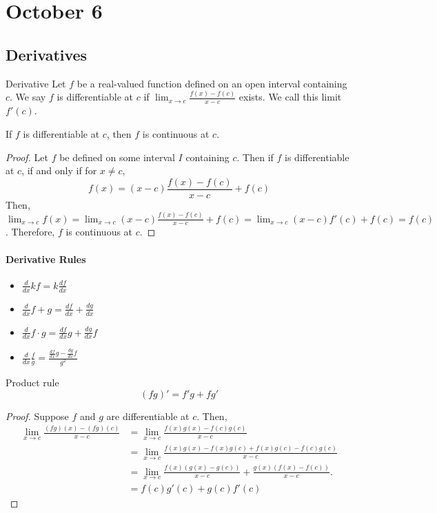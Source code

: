 \section{October 6}

\subsection{Derivatives}
\begin{definition}{Derivative}{}
    Let $f$ be a real-valued function defined on an open interval containing $c$. We say $f$ is differentiable at $c$ if $\lim_{x \to c} \frac{f(x) - f(c)}{x - c}$ exists. We call this limit $f'(c)$.
\end{definition}

\begin{theorem}{}{}
    If $f$ is differentiable at $c$, then $f$ is continuous at $c$.
\end{theorem}
\begin{proof}
    Let $f$ be defined on some interval $I$ containing $c$. Then if $f$ is differentiable at $c$, if and only if for $x \neq c$, $$f(x) = (x - c) \frac{f(x) - f(c)}{x - c} + f(c)$$ Then, $\lim_{x \to c} f(x) = \lim_{x \to c} (x - c) \frac{f(x) - f(c)}{x - c} + f(c) = \lim_{x \to c} (x - c) f'(c) + f(c) = f(c)$. Therefore, $f$ is continuous at $c$.
\end{proof}

\paragraph{Derivative Rules}
\begin{itemize}
    \item $\frac{d}{dx} kf = k \frac{df}{dx}$
    \item $\frac{d}{dx} f + g = \frac{df}{dx} + \frac{dg}{dx}$
    \item $\frac{d}{dx} f \cdot g = \frac{df}{dx} g + \frac{dg}{dx} f$
    \item $\frac{d}{dx} \frac{f}{g} = \frac{\frac{df}{dx} g - \frac{dg}{dx} f}{g^2}$
\end{itemize}

\begin{theorem}{Product rule}{}
    $$(fg)' = f'g + fg'$$
\end{theorem}
\begin{proof}
    Suppose $f$ and $g$ are differentiable at $c$. Then,
    \begin{align*}
        \lim_{x \to c} \frac{(fg)(x) - (fg)(c)}{x - c} &= \lim_{x \to c} \frac{f(x)g(x) - f(c)g(c)}{x - c} \\
        &= \lim_{x \to c} \frac{f(x)g(x) - f(x)g(c) + f(x)g(c) - f(c)g(c)}{x - c} \\
        &= \lim_{x \to c} \frac{f(x) (g(x) - g(c))}{x - c} + \frac{g(x) (f(x) - f(c))}{x - c}. \\
        &= f(c)g'(c) + g(c)f'(c)
    \end{align*}
\end{proof}

